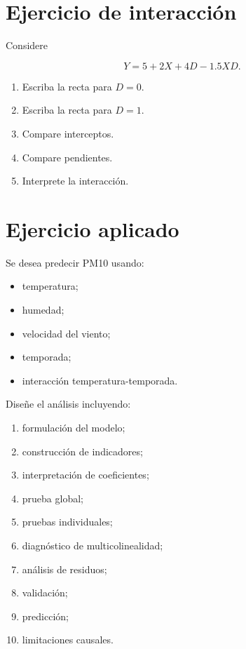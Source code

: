 \documentclass[
  spanish,
  10.5pt,
  letterpaper,
  DIV=11,
  numbers=noendperiod,
  oneside,
  open=any]{scrreprt}
\providecommand{\tightlist}{%
  \setlength{\itemsep}{0pt}\setlength{\parskip}{0pt}}
\theoremstyle{definition}
\theoremstyle{definition}
\theoremstyle{plain}
\theoremstyle{remark}
\begin{document}
\section*{Ejercicio de interacción}\label{ejercicio-de-interacciuxf3n}


Considere

\[
Y
=
5
+
2X
+
4D
-
1.5XD.
\]

\begin{enumerate}
\def\labelenumi{\arabic{enumi}.}
\tightlist
\item
  Escriba la recta para \(D=0\).
\item
  Escriba la recta para \(D=1\).
\item
  Compare interceptos.
\item
  Compare pendientes.
\item
  Interprete la interacción.
\end{enumerate}

\section*{Ejercicio aplicado}\label{ejercicio-aplicado-6}


Se desea predecir PM10 usando:

\begin{itemize}
\tightlist
\item
  temperatura;
\item
  humedad;
\item
  velocidad del viento;
\item
  temporada;
\item
  interacción temperatura-temporada.
\end{itemize}

Diseñe el análisis incluyendo:

\begin{enumerate}
\def\labelenumi{\arabic{enumi}.}
\tightlist
\item
  formulación del modelo;
\item
  construcción de indicadores;
\item
  interpretación de coeficientes;
\item
  prueba global;
\item
  pruebas individuales;
\item
  diagnóstico de multicolinealidad;
\item
  análisis de residuos;
\item
  validación;
\item
  predicción;
\item
  limitaciones causales.
\end{enumerate}
\end{document}
